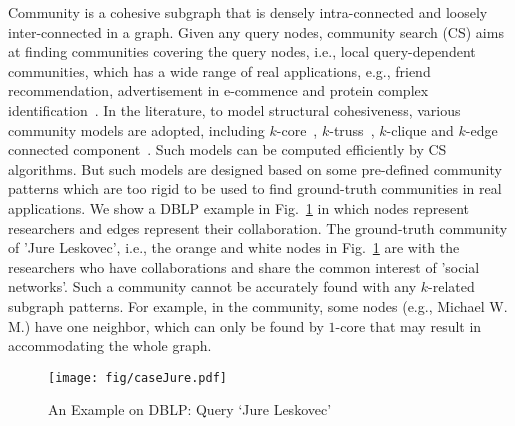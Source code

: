 \documentclass[conference]{IEEEtran}
\begin{document}
Community is a cohesive subgraph that is densely intra-connected and
loosely inter-connected in a graph. Given any query nodes, community
search (CS) aims at finding communities covering the query nodes,
i.e., local query-dependent communities, which has a wide range of
real applications, e.g., friend recommendation, advertisement in
e-commence and protein complex
identification~\cite{DBLP:journals/vldb/FangHQZZCL20,
  DBLP:series/synthesis/2019Huang}.
%
% 
In the literature, to model structural cohesiveness, various
community models are adopted, including $k$-core~\cite{cs3,cs4,cs6},
$k$-truss~\cite{cs2,cs7}, $k$-clique \cite{cs1,cs8} and $k$-edge
connected component~\cite{cs9,cs10}. Such models can be computed
efficiently by CS algorithms.
%
But such models are designed based on some pre-defined community
patterns which are too rigid to be used to find ground-truth
communities in real applications.  We show a DBLP example in
Fig.~\ref{fig:case} in which nodes represent researchers
%
%
and edges represent their collaboration.
% 
%
The ground-truth community of 'Jure Leskovec', i.e., the orange and
white nodes in Fig.~\ref{fig:case} are with the researchers who have
collaborations and share the common interest of 'social
networks'. Such a community cannot be accurately found with any
$k$-related subgraph patterns. For example, in the community, some
nodes (e.g., Michael W. M.) have one neighbor, which can only be found
by $1$-core that may result in accommodating the whole graph.


\begin{figure}[t] 
	\centering 
	\texttt{[image: fig/caseJure.pdf]} 
	\vspace{-0.4cm}
	\caption{An Example on DBLP: Query `Jure Leskovec'} 
	\vspace{-0.4cm}
	\label{fig:case} 
\end{figure}
\end{document}
